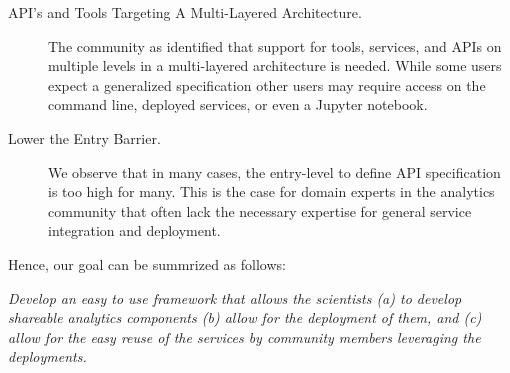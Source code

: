\begin{description}
\item[API's and Tools Targeting A Multi-Layered Architecture.] The
  community as identified that support for tools, services, and APIs
  on multiple levels in a multi-layered architecture is needed. While
  some users expect a generalized specification other users may
  require access on the command line, deployed services, or even a
  Jupyter notebook.
  
\item[Lower the Entry Barrier.] We observe that in many cases, the entry-level to
  define API specification is too high for many. This is the case for
  domain experts in the analytics community that often lack the
  necessary expertise for general service integration and deployment.

\end{description}


Hence, our goal can be summrized as follows:

{\em Develop an easy to use framework that allows the scientists (a)
to develop shareable analytics components (b) allow for the deployment
of them, and (c) allow for the easy reuse of the services by community
members leveraging the deployments.}


